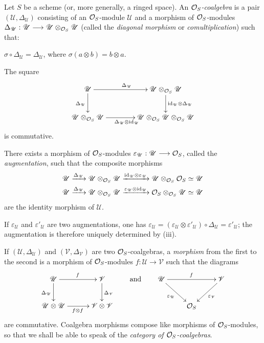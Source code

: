 Let $S$ be a scheme (or, more generally, a ringed space). An \emph{$\mathcal{O}_S$-coalgebra} is a pair $(\mathscr U,\Delta_{\mathscr U})$ consisting of an $\mathcal{O}_S$-module $\mathscr U$ and a morphism of $\mathcal{O}_S$-modules $\Delta_{\mathscr U}:\mathscr U\longrightarrow\mathscr U\otimes_{\mathcal{O}_S}\mathscr U$ (called the \emph{diagonal morphism} or \emph{comultiplication}) such that:
\begin{enumeratei}
\item $\sigma\circ\Delta_{\mathscr U}=\Delta_{\mathscr U}$, where $\sigma(a\otimes b)=b\otimes a$.
\item The square
\[
\xymatrix@C=4em{\mathscr U\ar[r]^{\Delta_{\mathscr U}}\ar[d]_{\Delta_{\mathscr U}}&\mathscr U\otimes_{\OS}\mathscr U\ar[d]^{\mathrm{id}_{\mathscr U}\otimes\Delta_{\mathscr U}}\\
\mathscr U\otimes_{\OS}\mathscr U\ar[r]_{\Delta_{\mathscr U}\otimes\mathrm{id}_{\mathscr U}}&\mathscr U\otimes_{\OS}\mathscr U\otimes_{\OS}\mathscr U}
\]
is commutative.
\item There exists a morphism of $\mathcal{O}_S$-modules $\varepsilon_{\mathscr U}:\mathscr U\longrightarrow\mathcal{O}_S$, called the \emph{augmentation}, such that the composite morphisms
\[
\begin{gathered}
\mathscr U\xrightarrow{\Delta_{\mathscr U}}\mathscr U\otimes_{\mathcal{O}_S}\mathscr U\xrightarrow{\mathrm{id}_{\mathscr U}\otimes\varepsilon_{\mathscr U}}\mathscr U\otimes_{\mathcal{O}_S}\mathcal{O}_S\simeq\mathscr U\\
\mathscr U\xrightarrow{\Delta_{\mathscr U}}\mathscr U\otimes_{\mathcal{O}_S}\mathscr U\xrightarrow{\varepsilon_{\mathscr U}\otimes\mathrm{id}_{\mathscr U}}\mathcal{O}_S\otimes_{\mathcal{O}_S}\mathscr U\simeq\mathscr U
\end{gathered}
\]
are the identity morphism of $\mathscr U$.
\end{enumeratei}
If $\varepsilon_{\mathscr U}$ and $\varepsilon'_{\mathscr U}$ are two augmentations, one has $\varepsilon_{\mathscr U}=(\varepsilon_{\mathscr U}\otimes\varepsilon'_{\mathscr U})\circ\Delta_{\mathscr U}=\varepsilon'_{\mathscr U}$; the augmentation is therefore uniquely determined by (iii).

If $(\mathscr U,\Delta_{\mathscr U})$ and $(\mathscr V,\Delta_{\mathscr V})$ are two $\mathcal{O}_S$-coalgebras, a \emph{morphism} from the first to the second is a morphism of $\mathcal{O}_S$-modules $f:\mathscr U\to\mathscr V$ such that the diagrams
\[
\xymatrix@C=3em{\mathscr U\ar[r]^f\ar[d]_{\Delta_{\mathscr U}}&\mathscr V\ar[d]^{\Delta_{\mathscr V}}\\
\mathscr U\otimes\mathscr U\ar[r]_{f\otimes f}&\mathscr V\otimes\mathscr V}
\qquad\text{and}\qquad
\xymatrix{\mathscr U\ar[rr]^f\ar[dr]_{\varepsilon_{\mathscr U}}&&\mathscr V\ar[dl]^{\varepsilon_{\mathscr V}}\\&\OS&}
\]
are commutative. Coalgebra morphisms compose like morphisms of $\mathcal{O}_S$-modules, so that we shall be able to speak of the \emph{category of $\mathcal{O}_S$-coalgebras}.

